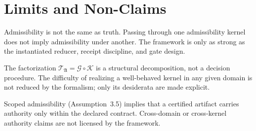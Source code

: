 \documentclass[12pt]{amsart}
\numberwithin{equation}{section}
\theoremstyle{definition}
\theoremstyle{remark}
\newcommand{\KK}{\mathcal K}
\newcommand{\GG}{\mathcal G}
\newcommand{\TT}{\mathcal T}
\begin{document}
\section{Limits and Non-Claims}

Admissibility is not the same as truth.  Passing through one admissibility kernel does not
imply admissibility under another.  The framework is only as strong as the instantiated
reducer, receipt discipline, and gate design.

The factorization $\TT_{\mathfrak A} = \GG \circ \KK$ is a structural decomposition, not a
decision procedure.  The difficulty of realizing a well-behaved kernel in any given domain is
not reduced by the formalism; only its desiderata are made explicit.

Scoped admissibility (Assumption~3.5) implies that a certified artifact carries authority only
within the declared contract.  Cross-domain or cross-kernel authority claims are not licensed
by the framework.
\end{document}
